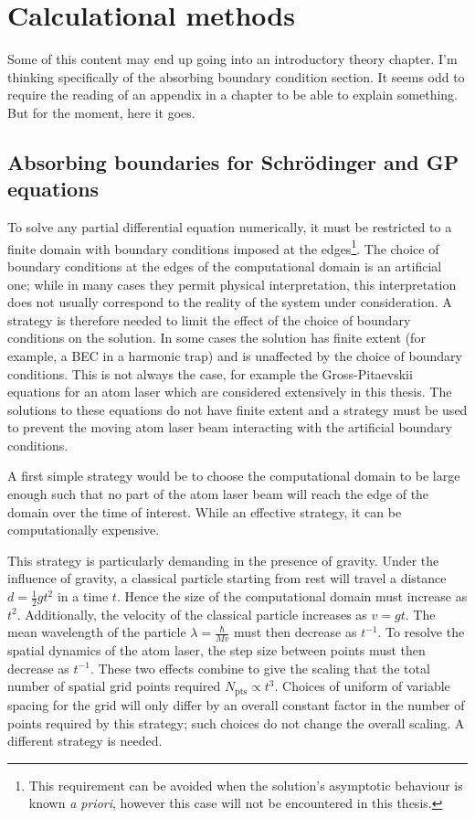 \chapter{Calculational methods}
\label{MethodsAppendix}
\graphicspath{{Figures/MethodsAppendix/}{Figures/Common/}}

Some of this content may end up going into an introductory theory chapter. I'm thinking specifically of the absorbing boundary condition section. It seems odd to require the reading of an appendix in a chapter to be able to explain something. But for the moment, here it goes.

\section{Absorbing boundaries for Schrödinger and GP equations}

To solve any partial differential equation numerically, it must be restricted to a finite domain with boundary conditions imposed at the edges\footnote{This requirement can be avoided when the solution's asymptotic behaviour is known \emph{a priori}, however this case will not be encountered in this thesis.}. The choice of boundary conditions at the edges of the computational domain is an artificial one; while in many cases they permit physical interpretation, this interpretation does not usually correspond to the reality of the system under consideration. A strategy is therefore needed to limit the effect of the choice of boundary conditions on the solution.  In some cases the solution has finite extent (for example, a BEC in a harmonic trap) and is unaffected by the choice of boundary conditions.  This is not always the case, for example the Gross-Pitaevskii equations for an atom laser which are considered extensively in this thesis.  The solutions to these equations do not have finite extent and a strategy must be used to prevent the moving atom laser beam interacting with the artificial boundary conditions.

A first simple strategy would be to choose the computational domain to be large enough such that no part of the atom laser beam will reach the edge of the domain over the time of interest. While an effective strategy, it can be computationally expensive.

This strategy is particularly demanding in the presence of gravity. Under the influence of gravity, a classical particle starting from rest will travel a distance $d = \frac{1}{2}g t^2$ in a time $t$. Hence the size of the computational domain must increase as $t^2$. Additionally, the velocity of the classical particle increases as $v = gt$. The mean wavelength of the particle $\displaystyle \lambda = \frac{\hbar}{Mv}$ must then decrease as $t^{-1}$. To resolve the spatial dynamics of the atom laser, the step size between points must then decrease as $t^{-1}$. These two effects combine to give the scaling that the total number of spatial grid points required $N_\text{pts} \propto t^3$. Choices of uniform of variable spacing for the grid will only differ by an overall constant factor in the number of points required by this strategy; such choices do not change the overall scaling. A different strategy is needed.

